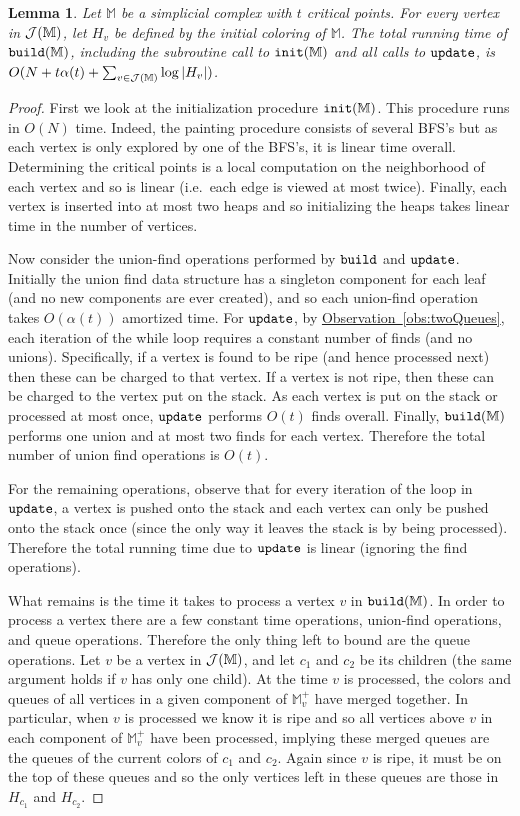 \documentclass[11pt]{article}
\newtheorem{lemma}[theorem]{Lemma}
\theoremstyle{definition}
\newcommand{\cJ}{{\cal J}}
\newcommand{\MM}{\mathbb{M}}
\newcommand{\Obs}[1]{\hyperref[obs:#1]{Observation~\ref*{obs:#1}}} %
\newcommand{\build}{{\tt build}}
\newcommand{\init}{{\tt init}}
\newcommand{\update}{{\tt update}}
\begin{document}
\begin{lemma}
\label{lem:runTimeUpper}
Let $\MM$ be a simplicial complex with $t$ critical points.  For every vertex in $\cJ(\MM)$, 
let $H_v$ be defined by the initial coloring of $\MM$.
The total running time of $\build(\MM)$, including the subroutine call to $\init(\MM)$ and all calls to $\update$, is $O(N+t\alpha(t) + \sum_{v \in \cJ(\MM)} \log |H_v|)$.
\end{lemma}
\begin{proof}
First we look at the initialization procedure $\init(\MM)$.  This procedure runs in $O(N)$ time.
Indeed, the painting procedure consists of several BFS's but as each vertex is only explored by one of the BFS's, it is linear time overall.
Determining the critical points is a local computation on the neighborhood of each vertex and so is linear (i.e.\ each edge is viewed at most twice).
Finally, each vertex is inserted into at most two heaps and so initializing the heaps takes linear time in the number of vertices.

Now consider the union-find operations performed by $\build$ and $\update$.  
Initially the union find data structure has a singleton component for each leaf (and no new components are ever created), 
and so each union-find operation takes $O(\alpha(t))$ amortized time.
For $\update$, by \Obs{twoQueues}, each iteration of the while loop requires a constant number of finds (and no unions).
Specifically, if a vertex is found to be ripe (and hence processed next) then these can be charged to that vertex.
If a vertex is not ripe, then these can be charged to the vertex put on the stack.
As each vertex is put on the stack or processed at most once, $\update$ performs $O(t)$ finds overall.
Finally, $\build(\MM)$ performs one union and at most two finds for each vertex.  Therefore the total number of union find 
operations is $O(t)$.

For the remaining operations, observe that for every iteration of the loop in $\update$, a vertex is pushed onto the stack and each
vertex can only be pushed onto the stack once (since the only way it leaves the stack is by being processed). 
Therefore the total running time due to $\update$ is linear (ignoring the find operations).

What remains is the time it takes to process a vertex $v$ in $\build(\MM)$.  
In order to process a vertex there are a few constant time operations, union-find operations, and queue operations.
Therefore the only thing left to bound are the queue operations.
Let $v$ be a vertex in $\cJ(\MM)$, and let $c_1$ and $c_2$ be its children (the same argument holds if $v$ has only one child).
At the time $v$ is processed, the colors and queues of all vertices in a given component of $\MM^+_v$ have merged together.
In particular, when $v$ is processed we know it is ripe and so all vertices above $v$ in each component of $\MM^+_v$ have been processed, implying 
these merged queues are the queues of the current colors of $c_1$ and $c_2$.  Again since $v$ is ripe, it must be on the top of these queues and so 
the only vertices left in these queues are those in $H_{c_1}$ and $H_{c_2}$. 


\end{proof}
\end{document}
